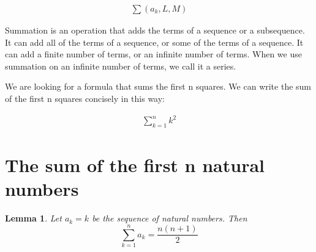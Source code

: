 \documentclass{article}
\newtheorem{lemma}{Lemma}
\begin{document}
\begin{align*}
\sum(a_{k}, L, M) 
\end{align*}
\begin{flushleft}
Summation is an operation that adds the terms of a sequence or a subsequence. It can add all of the terms of a sequence, or some of the terms of a sequence. It can add a finite number of terms, or an infinite number of terms. When we use summation on an infinite number of terms, we call it a series.
\end{flushleft}
\begin{flushleft}
We are looking for a formula that sums the first n squares. We can write the sum of the first n squares concisely in this way:
\end{flushleft}
\begin{align*}
\sum_{k=1}^{n} k^2
\end{align*}
\section{The sum of the first n natural numbers}

\begin{lemma}
Let $a_{k} = k$ be the sequence of natural numbers. Then
\begin{equation*}
\sum_{k=1}^{n} a_{k} = \frac{n(n+1)}{2}
\end{equation*}
\end{lemma}
\end{document}
